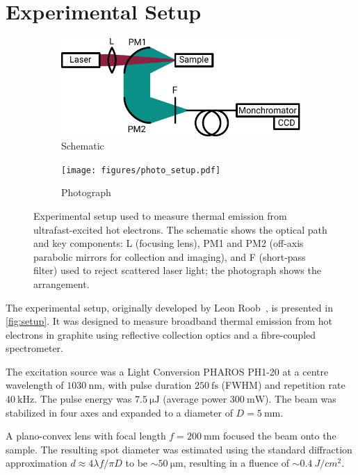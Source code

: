\documentclass[
	a4paper,
]{scrarticle}
\begin{document}
\section{Experimental Setup}
\begin{figure}[h]
    \centering
    \begin{subfigure}{3.5in}
        \centering
        \includegraphics{figures/setup.pdf}
        \caption{Schematic}
    \end{subfigure}\hfill
    \begin{subfigure}{2in}
        \centering
        \texttt{[image: figures/photo\_setup.pdf]}
        \caption{Photograph}
    \end{subfigure}
    \caption{Experimental setup used to measure thermal emission from ultrafast-excited hot electrons. The schematic shows the optical path and key components: L (focusing lens), PM1 and PM2 (off-axis parabolic mirrors for collection and imaging), and F (short-pass filter) used to reject scattered laser light; the photograph shows the arrangement.}
    \label{fig:setup}
\end{figure}

The experimental setup, originally developed by Leon Roob~\cite{roobThermalRadiationUltrafast2025}, is presented in \autoref{fig:setup}. It was designed to measure broadband thermal emission from hot electrons in graphite using reflective collection optics and a fibre-coupled spectrometer.

The excitation source was a Light Conversion PHAROS PH1-20 at a centre wavelength of $\SI{1030}{\nano\metre}$, with pulse duration $\SI{250}{\femto\second}$ (FWHM) and repetition rate $\SI{40}{\kilo\hertz}$. The pulse energy was $\SI{7.5}{\micro\joule}$ (average power $\SI{300}{\milli\watt}$). The beam was stabilized in four axes and expanded to a diameter of $D=\SI{5}{\milli\metre}$.

A plano-convex lens with focal length \(f=\SI{200}{\milli\metre}\) focused the beam onto the sample. The resulting spot diameter was estimated using the standard diffraction approximation \(d \approx 4\lambda f / \pi D\) to be \(\sim\SI{50}{\micro\metre}\), resulting in a fluence of \(\sim \SI{0.4}{J/cm^2}\).
\end{document}
